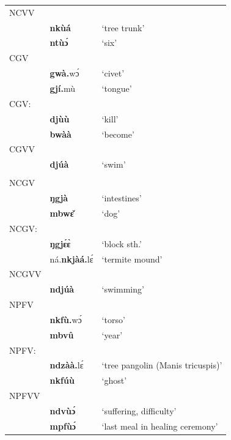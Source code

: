 \begin{tabular}{lll}
NCVV & & \\
   & {\bfseries nkùá} & `tree trunk' \\
   & {\bfseries ntùɔ́} & `six' \\



CGV & & \\
   & {\bfseries gwà.}wɔ́ & `civet' \\
   & {\bfseries gjí.}mù & `tongue' \\
CGV: & & \\
   & {\bfseries djùù} & `kill' \\
   & {\bfseries bwàà} & `become' \\
CGVV & & \\
   & {\bfseries djúà} & `swim' \\
   & & \\

NCGV & & \\
    & {\bfseries ŋgjà} & `intestines' \\
     & {\bfseries mbwɛ̌} & `dog' \\
NCGV: & & \\
    & {\bfseries ŋgjɛ́ɛ̀} & `block sth.' \\
     & ná.{\bfseries nkjàá.}lɛ́ & `termite mound' \\
NCGVV & & \\
    & {\bfseries ndjúà} & `swimming' \\

NPFV & & \\
     & {\bfseries nkfù.}wɔ́ & `torso' \\
     & {\bfseries mbvû} & `year' \\
NPFV: & & \\
     & {\bfseries ndzàà.}lɛ́ & `tree pangolin (Manis tricuspis)' \\
     & {\bfseries nkfúù} & `ghost' \\
NPFVV & & \\
     & {\bfseries ndvùɔ́} & `suffering, difficulty' \\
     & {\bfseries mpfùɔ́} & `last meal in healing ceremony' \\
\end{tabular}

